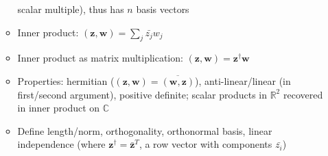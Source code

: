 \begin{itemize}
\begin{itemize}
                        scalar multiple), thus has $n$ basis vectors
                  \item Inner product: $(\mathbf{z},\mathbf{w})=\sum_{j}\bar{z_{j}}w_{j}$
                  \item Inner product as matrix multiplication: $(\mathbf{z},\mathbf{w})=\mathbf{z^{\dagger}}\mathbf{w}$
                  \item Properties: hermitian ($(\mathbf{z},\mathbf{w}) = \overline{(\mathbf{w},\mathbf{z})}$), anti-linear/linear (in first/second argument),
                        positive definite; scalar products in $\mathbb{R}^{2}$ recovered
                        in inner product on $\mathbb{C}$
                  \item Define length/norm, orthogonality, orthonormal basis, linear independence
                        (where $\mathbf{z^{\dagger}}=\bar{\mathbf{z}}^T$, a row vector
                        with components $\bar{z_{i}}$)
            \end{itemize}
\end{itemize}


